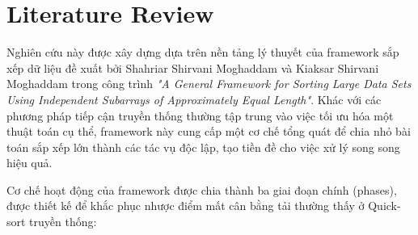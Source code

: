 \section{Literature Review}

Nghiên cứu này được xây dựng dựa trên nền tảng lý thuyết của framework sắp xếp dữ liệu đề xuất bởi Shahriar Shirvani Moghaddam và Kiaksar Shirvani Moghaddam trong công trình \textit{"A General Framework for Sorting Large Data Sets Using Independent Subarrays of Approximately Equal Length"}\cite{moghaddam2022general}. Khác với các phương pháp tiếp cận truyền thống thường tập trung vào việc tối ưu hóa một thuật toán cụ thể, framework này cung cấp một cơ chế tổng quát để chia nhỏ bài toán sắp xếp lớn thành các tác vụ độc lập, tạo tiền đề cho việc xử lý song song hiệu quả.

Cơ chế hoạt động của framework được chia thành ba giai đoạn chính (phases), được thiết kế để khắc phục nhược điểm mất cân bằng tải thường thấy ở Quick-sort truyền thống:

